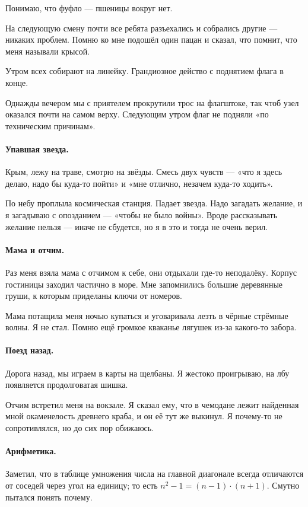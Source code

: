 \documentclass{book}
\begin{document}
Понимаю, что фуфло --- пшеницы вокруг нет.

На следующую смену почти все ребята разъехались и собрались другие ---
никаких проблем.
Помню ко мне подошёл один пацан и сказал, что помнит, что меня называли крысой.

Утром всех собирают на линейку.
Грандиозное действо с поднятием флага в конце.

Однажды вечером мы с приятелем прокрутили трос на флагштоке, так чтоб узел оказался почти на самом верху.
Следующим утром флаг не подняли «по техническим причинам».

\paragraph{Упавшая звезда.}
Крым, лежу на траве, смотрю на звёзды.
Смесь двух чувств --- «что я здесь делаю, надо бы куда-то пойти» и «мне отлично, незачем куда-то ходить».

По небу проплыла космическая станция.
Падает звезда. 
Надо загадать желание, и я загадываю с опозданием --- «чтобы не было войны».
Вроде рассказывать желание нельзя --- иначе не сбудется, но я в это и тогда не очень верил.

\paragraph{Мама и отчим.}
Раз меня взяла мама с отчимом к себе, они отдыхали где-то неподалёку.
Корпус гостиницы заходил частично в море.
Мне запомнились большие деревянные груши, к которым приделаны ключи от номеров.

Мама потащила меня ночью купаться и уговаривала лезть в чёрные стрёмные волны.
Я не стал.
Помню ещё громкое кваканье лягушек из-за какого-то забора.

\paragraph{Поезд назад.}
Дорога назад, мы играем в карты на щелбаны.
Я жестоко проигрываю, на лбу появляется продолговатая шишка.

Отчим встретил меня на вокзале. 
Я сказал ему, что в чемодане лежит найденная мной окаменелость древнего краба, и он её тут же выкинул.
Я почему-то не сопротивлялся, но до сих пор обижаюсь.

\paragraph{Арифметика.}
Заметил, что в таблице умножения числа на главной диагонале всегда отличаются от соседей через угол на единицу;
то есть $n^2-1=(n-1)\cdot (n+1)$.
Смутно пытался понять почему.
\end{document}

